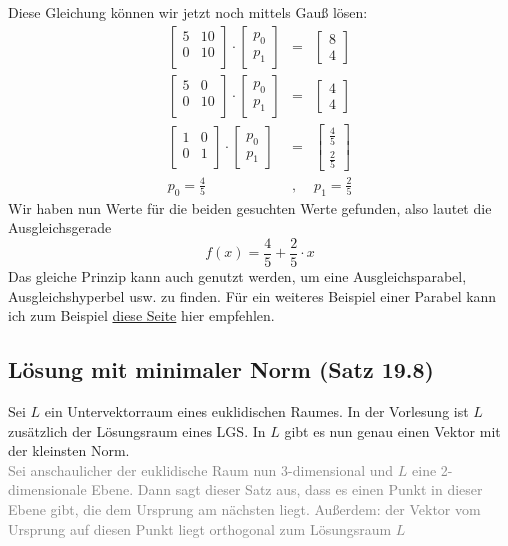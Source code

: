 \documentclass{report}
\begin{document}
				Diese Gleichung können wir jetzt noch mittels Gauß lösen:
				\begin{eqnarray*}
					\begin{bmatrix}
						5 & 10 \\ 0 & 10 \\
					\end{bmatrix} \cdot \begin{bmatrix}
						p_0 \\ p_1
					\end{bmatrix} &=& \begin{bmatrix} 8 \\ 4 \end{bmatrix} \\
					\begin{bmatrix}
						5 & 0 \\ 0 & 10 \\
					\end{bmatrix} \cdot \begin{bmatrix}
						p_0 \\ p_1
					\end{bmatrix} &=& \begin{bmatrix} 4 \\ 4 \end{bmatrix} \\
					\begin{bmatrix}
						1 & 0 \\ 0 & 1 \\
					\end{bmatrix} \cdot \begin{bmatrix}
						p_0 \\ p_1
					\end{bmatrix} &=& \begin{bmatrix} \frac45 \\ \frac25 \end{bmatrix} \\
					p_0 = \frac45 &, & p_1 = \frac25
				\end{eqnarray*}
				Wir haben nun Werte für die beiden gesuchten Werte gefunden, also lautet die Ausgleichsgerade
				\begin{equation*}
					f(x) = \frac45 + \frac25 \cdot x
				\end{equation*}
				Das gleiche Prinzip kann auch genutzt werden, um eine Ausgleichsparabel, Ausgleichshyperbel usw. zu finden. Für ein weiteres Beispiel einer Parabel kann ich zum Beispiel \href{https://www.abi-mathe.de/buch/matrizen/methode-der-kleinsten-quadrate/}{diese Seite} hier empfehlen.
			\subsection{Lösung mit minimaler Norm (Satz 19.8)}
				Sei $L$ ein Untervektorraum eines euklidischen Raumes. In der Vorlesung ist $L$ zusätzlich der Lösungsraum eines LGS. In $L$ gibt es nun genau einen Vektor mit der kleinsten Norm.\\
				\textcolor{gray}{Sei anschaulicher der euklidische Raum nun 3-dimensional und $L$ eine 2-dimensionale Ebene. Dann sagt dieser Satz aus, dass es einen Punkt in dieser Ebene gibt, die dem Ursprung am nächsten liegt. Außerdem: der Vektor vom Ursprung auf diesen Punkt liegt orthogonal zum Lösungsraum $L$}
\end{document}
